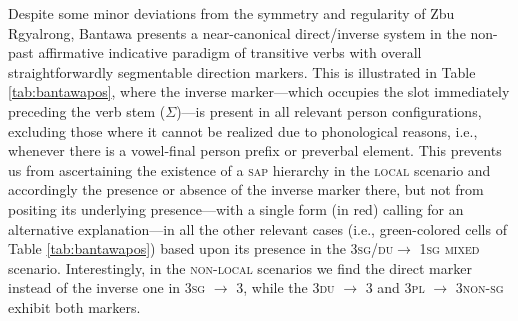 \documentclass[twoside,a4paper,11pt]{article}
\newcommand{\Σ}{\greek{Σ}}
\newcommand{\ro}{$\Sigma$}
\begin{document}
Despite some minor deviations from the symmetry and regularity of Zbu Rgyalrong, Bantawa presents a near-canonical direct/inverse system in the non-past affirmative indicative paradigm of transitive verbs with overall straightforwardly segmentable direction markers. This is illustrated in Table \vref{tab:bantawapos}, where the inverse marker---which occupies the slot immediately preceding the verb stem (\ro{})---is present in all relevant person configurations, excluding those where it cannot be realized due to phonological reasons, i.e., whenever there is a vowel-final person prefix or preverbal element. This prevents us from ascertaining the existence of a \textsc{sap} hierarchy in the \textsc{local} scenario and accordingly the presence or absence of the inverse marker there, but not from positing its underlying presence---with a single form (in red) calling for an alternative explanation---in all the other relevant cases (i.e., green-colored cells 
of Table \ref{tab:bantawapos}) based upon its presence in the 3\textsc{sg}/\textsc{du}$\rightarrow$ 1\textsc{sg} \textsc{mixed} scenario. Interestingly, in the \textsc{non-local} scenarios we find the direct marker instead of the inverse one in 3\textsc{sg} $\rightarrow$ 3, while the 3\textsc{du} $\rightarrow$ 3 and 3\textsc{pl} $\rightarrow$ 3\textsc{non-sg} exhibit both markers.
\end{document}
